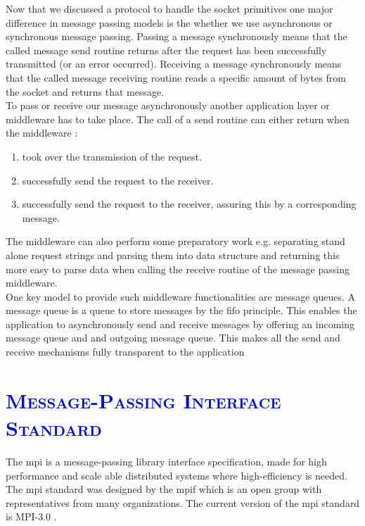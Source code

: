 \documentclass[xcolor=dvipsnames]{article}
\begin{document}
\noindent Now that we discussed a protocol to handle the socket primitives one major difference in message passing models is the whether we use asynchronous or synchronous message passing. Passing a message synchronously means that the called message send routine returns after the request has been successfully transmitted (or an error occurred). Receiving a message synchronously means that the called message receiving routine reads a specific amount of bytes from the socket and returns that message.\\

\noindent To pass or receive our message asynchronously another application layer or middleware has to take place. The call of a send routine can either return when the middleware \cite[ch. 4.1 on p. 125]{tanenbaum}:

\begin{enumerate}
\item took over the transmission of the request.
\item successfully send the request to the receiver.
\item successfully send the request to the receiver, assuring this by a corresponding message.
\end{enumerate}

\noindent The middleware can also perform some preparatory work e.g. separating stand alone request strings and parsing them into data structure and returning this more easy to parse data when calling the receive routine of the message passing middleware.\\

\noindent One key model to provide such middleware functionalities are message queues. A message queue is a queue to store messages by the \gls{fifo} principle. This enables the application to asynchronously send and receive messages by offering an incoming message queue and and outgoing message queue. This makes all the send and receive mechanisms fully transparent to the application \cite[ch. 4.3.2 on p. 145 - 147]{tanenbaum}

\section{\scshape{\textcolor{blue}{Message-Passing Interface Standard}}} \label{message_passing_interface}

The \gls{mpi} is a message-passing library interface specification, made for high performance and scale able distributed systems where high-efficiency is needed.  The \gls{mpi} standard was designed by the \gls{mpif} which is an open group with representatives from many organizations. The current version of the \gls{mpi} standard is MPI-3.0 \cite[ch. Abstract/ii \& Acknowledgements/xx \& 1.1 on p. 1]{mpi}.\\
\end{document}
